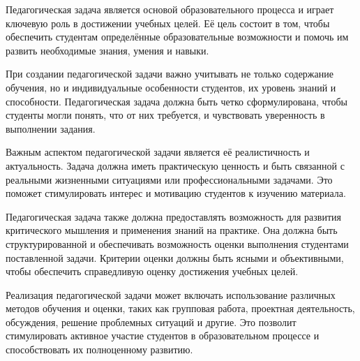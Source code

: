 
Педагогическая задача является основой образовательного процесса и играет ключевую роль в достижении учебных целей. Её цель состоит в том, чтобы обеспечить студентам определённые образовательные возможности и помочь им развить необходимые знания, умения и навыки.

При создании педагогической задачи важно учитывать не только содержание обучения, но и индивидуальные особенности студентов, их уровень знаний и способности. Педагогическая задача должна быть четко сформулирована, чтобы студенты могли понять, что от них требуется, и чувствовать уверенность в выполнении задания.

Важным аспектом педагогической задачи является её реалистичность и актуальность. Задача должна иметь практическую ценность и быть связанной с реальными жизненными ситуациями или профессиональными задачами. Это поможет стимулировать интерес и мотивацию студентов к изучению материала.

Педагогическая задача также должна предоставлять возможность для развития критического мышления и применения знаний на практике. Она должна быть структурированной и обеспечивать возможность оценки выполнения студентами поставленной задачи. Критерии оценки должны быть ясными и объективными, чтобы обеспечить справедливую оценку достижения учебных целей.

Реализация педагогической задачи может включать использование различных методов обучения и оценки, таких как групповая работа, проектная деятельность, обсуждения, решение проблемных ситуаций и другие. Это позволит стимулировать активное участие студентов в образовательном процессе и способствовать их полноценному развитию.

